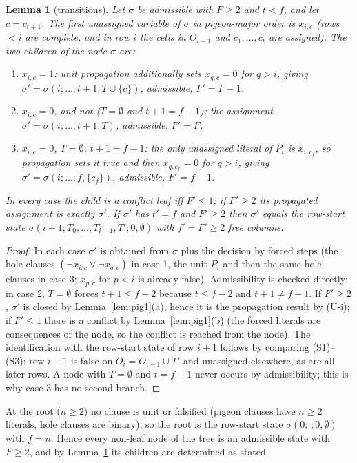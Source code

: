 \documentclass[11pt]{article}
\newtheorem{lemma}{Lemma}
\theoremstyle{definition}
\theoremstyle{remark}
\begin{document}
\begin{lemma}[transitions]\label{lem:pig2}
Let $\sigma$ be admissible with $F\ge2$ and $t<f$, and let $c=c_{t+1}$. The first unassigned
variable of $\sigma$ in pigeon-major order is $x_{i,c}$ (rows $<i$ are complete, and in row $i$ the cells in
$O_{i-1}$ and $c_1,\dots,c_t$ are assigned). The two children of the node $\sigma$ are:
\begin{enumerate}
\item $x_{i,c}=1$: unit propagation additionally sets $x_{q,c}=0$ for $q>i$, giving
  $\sigma'=\sigma(i;\dots;t{+}1,T\cup\{c\})$, admissible, $F'=F-1$.
\item $x_{i,c}=0$, and not ($T=\emptyset$ and $t+1=f-1$): the assignment
  $\sigma'=\sigma(i;\dots;t{+}1,T)$, admissible, $F'=F$.
\item $x_{i,c}=0$, $T=\emptyset$, $t+1=f-1$: the only unassigned literal of $P_i$ is $x_{i,c_f}$, so
  propagation sets it true and then $x_{q,c_f}=0$ for $q>i$, giving
  $\sigma'=\sigma(i;\dots;f,\{c_f\})$, admissible, $F'=f-1$.
\end{enumerate}
In every case the child is a conflict leaf iff $F'\le1$; if $F'\ge2$ its propagated assignment is exactly
$\sigma'$. If $\sigma'$ has $t'=f$ and $F'\ge2$ then $\sigma'$ equals the row-start state
$\sigma(i{+}1;T_0,\dots,T_{i-1},T';0,\emptyset)$ with $f'=F'\ge2$ free columns.
\end{lemma}
\begin{proof}
In each case $\sigma'$ is obtained from $\sigma$ plus the decision by forced steps (the hole clauses
$(\neg x_{i,c}\vee\neg x_{q,c})$ in case 1, the unit $P_i$ and then the same hole clauses in case 3;
$x_{p,c}$ for $p<i$ is already false). Admissibility is checked directly: in case 2, $T=\emptyset$
forces $t+1\le f-2$ because $t\le f-2$ and $t+1\ne f-1$. If $F'\ge2$, $\sigma'$ is closed by
Lemma~\ref{lem:pig1}(a), hence it is the propagation result by (U-i); if $F'\le1$ there is a conflict by
Lemma~\ref{lem:pig1}(b) (the forced literals are consequences of the node, so the conflict is
reached from the node). The identification with the row-start state of row $i{+}1$ follows by
comparing (S1)--(S3): row $i{+}1$ is false on $O_i=O_{i-1}\cup T'$ and unassigned elsewhere, as are
all later rows. A node with $T=\emptyset$ and $t=f-1$ never occurs by admissibility; this is why case 3
has no second branch.
\end{proof}

At the root ($n\ge2$) no clause is unit or falsified (pigeon clauses have $n\ge2$ literals, hole
clauses are binary), so the root is the row-start state $\sigma(0;\,;0,\emptyset)$ with $f=n$. Hence
every non-leaf node of the tree is an admissible state with $F\ge2$, and by Lemma~\ref{lem:pig2}
its children are determined as stated.
\end{document}
